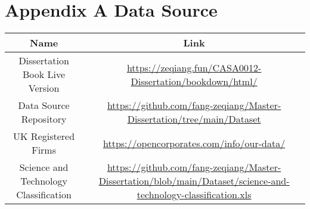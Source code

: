 \documentclass[
  12pt,
  oneside]{book}
\begin{document}
\printbibliography

\hypertarget{appendix-a-data-source}{%
\chapter*{Appendix A Data Source}\label{appendix-a-data-source}}


\begin{longtable}[]{@{}cc@{}}
\toprule
\begin{minipage}[b]{0.47\columnwidth}\centering
Name\strut
\end{minipage} & \begin{minipage}[b]{0.47\columnwidth}\centering
Link\strut
\end{minipage}\tabularnewline
\midrule
\endhead
\begin{minipage}[t]{0.47\columnwidth}\centering
Dissertation Book Live Version\strut
\end{minipage} & \begin{minipage}[t]{0.47\columnwidth}\centering
\url{https://zeqiang.fun/CASA0012-Dissertation/bookdown/html/}\strut
\end{minipage}\tabularnewline
\begin{minipage}[t]{0.47\columnwidth}\centering
Data Source Repository\strut
\end{minipage} & \begin{minipage}[t]{0.47\columnwidth}\centering
\url{https://github.com/fang-zeqiang/Master-Dissertation/tree/main/Dataset}\strut
\end{minipage}\tabularnewline
\begin{minipage}[t]{0.47\columnwidth}\centering
UK Registered Firms\strut
\end{minipage} & \begin{minipage}[t]{0.47\columnwidth}\centering
\url{https://opencorporates.com/info/our-data/}\strut
\end{minipage}\tabularnewline
\begin{minipage}[t]{0.47\columnwidth}\centering
Science and Technology Classification\strut
\end{minipage} & \begin{minipage}[t]{0.47\columnwidth}\centering
\url{https://github.com/fang-zeqiang/Master-Dissertation/blob/main/Dataset/science-and-technology-classification.xls}\strut
\end{minipage}\tabularnewline

\end{longtable}
\end{document}
